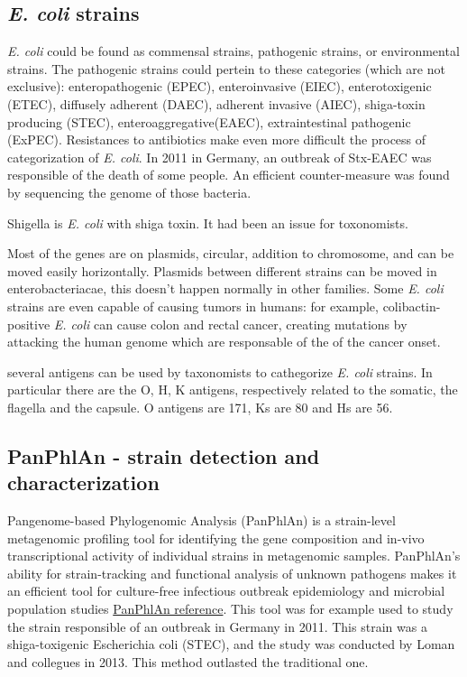 \subsection{\emph{E. coli} strains}
\emph{E. coli} could be found as commensal strains, pathogenic strains, or environmental strains. The pathogenic strains could pertein to these categories (which are not exclusive): enteropathogenic (EPEC), enteroinvasive (EIEC), enterotoxigenic (ETEC), diffusely adherent (DAEC), adherent invasive (AIEC), shiga-toxin producing (STEC), enteroaggregative(EAEC), extraintestinal pathogenic (ExPEC). Resistances to antibiotics make even more difficult the process of categorization of \emph{E. coli}. 
In 2011 in Germany, an outbreak of Stx-EAEC was responsible of the death of some people. An efficient counter-measure was found by sequencing the genome of those bacteria. 

Shigella is \emph{E. coli} with shiga toxin. It had been an issue for toxonomists.

Most of the genes are on plasmids, circular, addition to chromosome, and can be moved easily horizontally. Plasmids between different strains can be moved in enterobacteriacae, this doesn't happen normally in other families.
Some \emph{E. coli} strains are even capable of causing tumors in humans: for example, colibactin-positive \emph{\emph{E. coli}} can cause colon and rectal cancer, creating mutations by attacking the human genome which are responsable of the of the cancer onset.

several antigens can be used by taxonomists to cathegorize \emph{E. coli} strains. In particular there are the O, H, K antigens, respectively related to the somatic, the flagella and the capsule. O antigens are 171, Ks are 80 and Hs are 56.

\subsection{PanPhlAn - strain detection and characterization}

Pangenome-based Phylogenomic Analysis (PanPhlAn) is a strain-level metagenomic profiling tool
for identifying the gene composition and in-vivo transcriptional activity of individual strains in metagenomic samples. PanPhlAn’s ability for strain-tracking and functional analysis of unknown pathogens makes it an efficient tool for culture-free infectious outbreak epidemiology and microbial population studies \href{http://segatalab.cibio.unitn.it/tools/panphlan/}{PanPhlAn reference}. This tool was for example used to study the strain responsible of an outbreak in Germany in 2011. This strain was a shiga-toxigenic Escherichia coli (STEC), and the study was conducted by Loman and collegues in 2013.
This method outlasted the traditional one.



